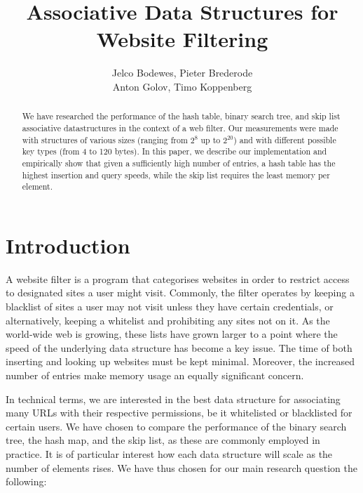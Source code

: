 \documentclass[12pt,a4paper]{article}
\title{Associative Data Structures for Website Filtering}
\author{Jelco Bodewes, Pieter Brederode \\ Anton Golov, Timo Koppenberg }
\begin{document}
    \maketitle

    \begin{abstract}
        We have researched the performance of the hash table, binary search tree, and skip list
        associative datastructures in the context of a web filter.  Our measurements were made with
        structures of various sizes (ranging from $2^8$ up to $2^{20}$) and with different possible
        key types (from 4 to 120 bytes).  In this paper, we describe our implementation and
        empirically show that given a sufficiently high number of entries, a hash table has the
        highest insertion and query speeds, while the skip list requires the least memory per
        element.
    \end{abstract}


    \section{Introduction}
    A website filter is a program that categorises websites in order to restrict access to designated
    sites a user might visit. Commonly, the filter operates by keeping a blacklist of sites a user may not visit
    unless they have certain credentials, or alternatively, keeping a whitelist and prohibiting any
    sites not on it.  As the world-wide web is growing, these lists have grown larger to a point where
    the speed of the underlying data structure has become a key issue.  The time of both inserting and
    looking up websites must be kept minimal. Moreover, the increased number of entries make memory
    usage an equally significant concern.

    In technical terms, we are interested in the best data structure for associating many URLs with
    their respective permissions, be it whitelisted or blacklisted for certain users.  We have
    chosen to compare the performance of the binary search tree, the hash map, and the skip list, as
    these are commonly employed in practice.  It is of particular interest how each data structure
    will scale as the number of elements rises.  We have thus chosen for our main research question
    the following:
\end{document}
